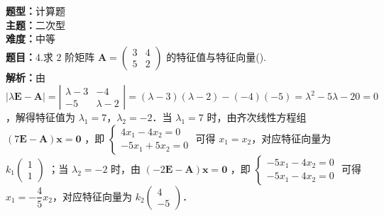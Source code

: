 \documentclass{ctexart}
\newenvironment{question}[5]{%
	\noindent\textbf{题型：}#1\\
	\textbf{主题：}#2\\
	\textbf{难度：}#3\\
	\textbf{题目：}#4\\
	\textbf{解析：}#5\\
	\vspace{1em}
}{}
\begin{document}
	\begin{question}
		{计算题}
		{二次型}
		{中等}
		{4.求 \(2\) 阶矩阵 \(\mathbf{A}=\left(\begin{array}{cc}3 & 4 \\ 5 & 2\end{array}\right)\) 的特征值与特征向量(\qquad). }
		{由 \(|\lambda \mathbf{E} - \mathbf{A}| = \left|\begin{array}{cc} \lambda - 3 & -4 \\ -5 & \lambda - 2 \end{array}\right| = (\lambda - 3)(\lambda - 2) - (-4)(-5) = \lambda^2 - 5\lambda - 20 = 0\)，解得特征值为 \(\lambda_1 = 7\)，\(\lambda_2 = -2\)．当 \(\lambda_1 = 7\) 时，由齐次线性方程组 \((7\mathbf{E} - \mathbf{A})\mathbf{x} = \mathbf{0}\) ，即 \(\left\{\begin{array}{l}4x_1 - 4x_2 = 0 \\ -5x_1 + 5x_2 = 0\end{array}\right.\) 可得 \(x_1 = x_2\)，对应特征向量为 \(k_1 \begin{pmatrix}1 \\ 1\end{pmatrix}\) ；当 \(\lambda_2 = -2\) 时，由 \((-2\mathbf{E} - \mathbf{A})\mathbf{x} = \mathbf{0}\) ，即 \(\left\{\begin{array}{l}-5x_1 - 4x_2 = 0 \\ -5x_1 - 4x_2 = 0\end{array}\right.\) 可得 \(x_1 = -\dfrac{4}{5}x_2\)，对应特征向量为 \(k_2 \begin{pmatrix}4 \\ -5\end{pmatrix}\)．}
	\end{question}
\end{document}
